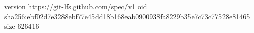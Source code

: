 version https://git-lfs.github.com/spec/v1
oid sha256:ebf02d7e3288ebf77e45dd18b168eab0900938fa8229b35e7c73c77528e81465
size 626416
